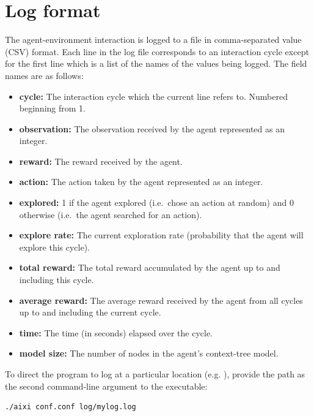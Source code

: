 \documentclass[a4paper,11pt]{article}
\begin{document}
\section{Log format}
The agent-environment interaction is logged to a file in comma-separated value (CSV) format. Each line in the log file corresponds to an interaction cycle except for the first line which is a list of the names of the values being logged. The field names are as follows:
\begin{itemize}
\item {\bf cycle:} The interaction cycle which the current line refers to. Numbered beginning from 1.

\item {\bf observation:} The observation received by the agent represented as an integer.

\item {\bf reward:} The reward received by the agent.

\item {\bf action:} The action taken by the agent represented as an integer.

\item {\bf explored:} 1 if the agent explored (i.e.~chose an action at random) and 0 otherwise (i.e.~the agent searched for an action).

\item {\bf explore rate:} The current exploration rate (probability that the agent will explore this cycle).

\item {\bf total reward:} The total reward accumulated by the agent up to and including this cycle.

\item {\bf average reward:} The average reward received by the agent from all cycles up to and including the current cycle.

\item {\bf time:} The time (in seconds) elapsed over the cycle.

\item {\bf model size:} The number of nodes in the agent's context-tree model.
\end{itemize}
To direct the program to log at a particular location (e.g. ), provide the path as the second command-line argument to the executable:
\begin{lstlisting}[frame=single]
./aixi conf.conf log/mylog.log
\end{lstlisting}
\end{document}

